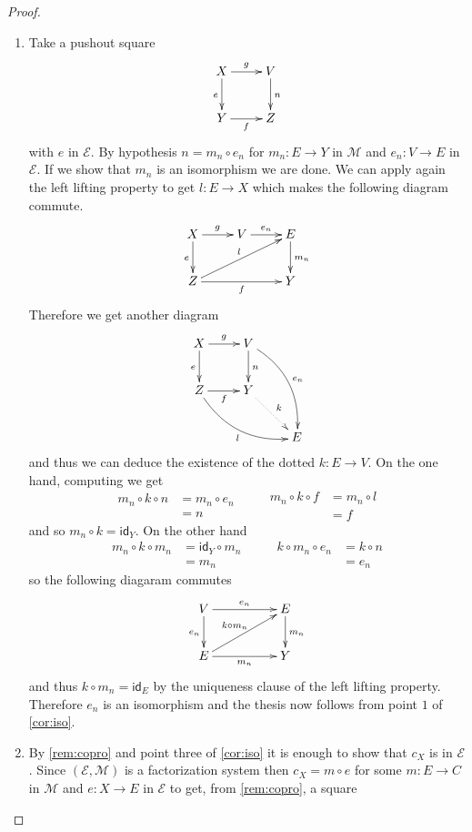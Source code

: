 \documentclass[a4paper]{article}
\newcommand{\id}[1]{\mathsf{id}_{#1}}
\theoremstyle{definition}
\begin{document}
\begin{proof}
	\begin{enumerate}
		\item 
		Take a pushout square
		\[\xymatrix{X\ar[r]^{g} \ar[d]_{e} & V \ar[d]^{n} \\ Y \ar[r]_{f}  & Z}\] 
		with $e$ in $\mathcal{E}$. By hypothesis  $n=m_n\circ e_n$ for $m_n\colon E\to Y$ in $ \mathcal{M}$  and $e_n\colon V\to E$ in  $\mathcal{E}$.  If we show that $m_n$ is an isomorphism we are done. We can apply again the left lifting property to get $l\colon E\to X$ which makes the following diagram commute.
		\[\xymatrix{X \ar[d]_{e}\ar[r]^{g}&  V \ar[r]^{e_n} &E\ar[d]^{m_n}\\  Z  \ar[urr]^{l} \ar[rr]_{f} && Y}\]
		Therefore we get another diagram
		\[\xymatrix{ X \ar[d]_{e}\ar[r]^{g}& V \ar@/^.5cm/[ddr]^{e_n} \ar[d]^{n} \\
			Z\ar@/_.5cm/[drr]_{l} \ar[r]_{f} & Y \ar@{.>}[dr]^{k}\\
			& &E }\]
		and thus we can deduce the existence of the dotted $k\colon E\to V$. On the one hand, computing we get
		\[\begin{split}
			m_n\circ k\circ n &=m_n  \circ  e_n\\ &=n
		\end{split}\qquad \begin{split}
			m_n\circ k\circ f &=m_n\circ l\\ &=f \end{split}\]
		and so $m_n\circ k= \id{Y}$.  On the other hand 
		\[\begin{split}
			m_n\circ k \circ m_n &= \id{Y} \circ m_n \\&= m_n
		\end{split} \qquad 
		\begin{split}
			k \circ m_n \circ e_n &= k\circ n \\&= e_n
		\end{split}
		\]	
		so the following diagaram commutes 
		\[
		\xymatrix@C=50pt{V \ar[d]_{e_n}\ar[r]^{e_n}& E \ar[d]^{m_n} \\
			E\ar[ur]^{k\circ m_n}\ar[r]_{m_n} & Y}\]
		and thus  $k\circ m_n=\id{E}$ by the uniqueness clause of the left lifting property. Therefore $e_n$ is an isomorphism and the thesis now follows from  point $1$ of \cref{cor:iso}.
		\item By \cref{rem:copro} and point three of \cref{cor:iso} it is enough to show that $c_X$ is in $\mathcal{E}$. Since $(\mathcal{E}, \mathcal{M})$ is a factorization system then $c_X=m\circ e$ for some $m\colon E\to C$ in $\mathcal{M}$ and $e\colon X\to E$ in $\mathcal{E}$ to get, from \cref{rem:copro}, a square

\end{enumerate}
\end{proof}
\end{document}
